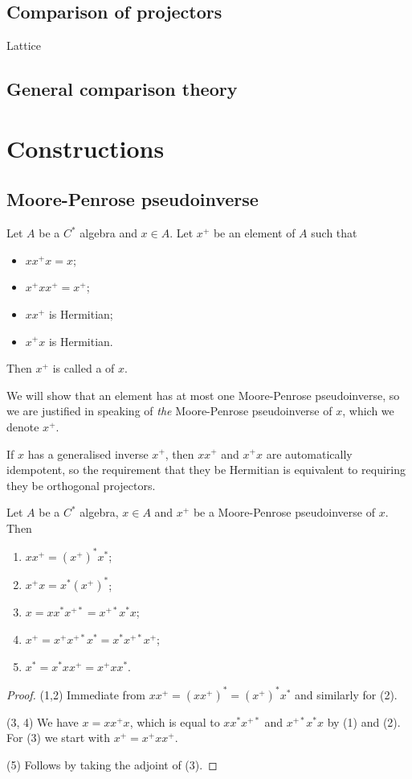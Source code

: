 \subsection{Comparison of projectors}
Lattice
\subsection{General comparison theory}

\section{Constructions}
\subsection{Moore-Penrose pseudoinverse}
\begin{definition}
Let $A$ be a $C^*$ algebra and $x\in A$. Let $x^+$ be an element of $A$ such that
\begin{itemize}
\item $xx^+x = x$;
\item $x^+xx^+ = x^+$;
\item $xx^+$ is Hermitian;
\item $x^+x$ is Hermitian.
\end{itemize}
Then $x^+$ is called a  of $x$.
\end{definition}
We will show that an element has at most one Moore-Penrose pseudoinverse, so we are justified in speaking of \emph{the} Moore-Penrose pseudoinverse of $x$, which we denote $x^+$.

If $x$ has a generalised inverse $x^+$, then $xx^+$ and $x^+x$ are automatically idempotent, so the requirement that they be Hermitian is equivalent to requiring they be orthogonal projectors.

\begin{lemma} \label{MoorePenrosePseudoinverseSwapLemma}
Let $A$ be a $C^*$ algebra, $x\in A$ and $x^+$ be a Moore-Penrose pseudoinverse of $x$. Then
\begin{enumerate}
\item $xx^+ = (x^+)^*x^*$;
\item $x^+x = x^*(x^+)^*$;
\item $x = xx^*x^{+*} = x^{+*}x^*x$;
\item $x^+ = x^+x^{+*}x^* = x^*x^{+*}x^+$;
\item $x^* = x^*xx^+ = x^+xx^*$.
\end{enumerate}
\end{lemma}
\begin{proof}
(1,2) Immediate from $xx^+ = (xx^+)^* = (x^+)^*x^*$ and similarly for (2).

(3, 4) We have $x = xx^+x$, which is equal to $xx^*x^{+*}$ and $x^{+*}x^*x$ by (1) and (2). For (3) we start with $x^+ = x^+xx^+$.

(5) Follows by taking the adjoint of (3).
\end{proof}

